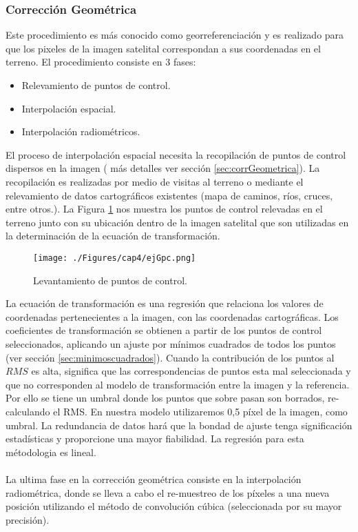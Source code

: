 \subsubsection{Correcci\'on Geom\'etrica}
Este procedimiento es m\'as conocido como georreferenciaci\'on y es realizado para que los pixeles de la imagen satelital correspondan a sus coordenadas en el terreno. El procedimiento consiste en 3 fases:
\begin{itemize}
	\item Relevamiento de puntos de control.
	\item Interpolaci\'on espacial.
	\item Interpolaci\'on radiom\'etricos.
\end{itemize}

El proceso de interpolación espacial necesita la recopilación de puntos de control dispersos en la imagen ( más detalles ver secci\'on \ref{sec:corrGeometrica}). La recopilaci\'on es realizadas por medio de visitas al terreno o mediante el relevamiento de datos cartogr\'aficos existentes (mapa de caminos, ríos, cruces, entre otros.). La Figura \ref{fig:gcp} nos muestra los puntos de control relevadas en el terreno junto con su ubicaci\'on dentro de la imagen satelital que son utilizadas en la determinaci\'on de la ecuaci\'on de transformaci\'on.
\begin{figure}[H]
	\centering
	\texttt{[image: ./Figures/cap4/ejGpc.png]}
	\caption{Levantamiento de puntos de control.}
	\label{fig:gcp}
\end{figure}

La ecuaci\'on de transformaci\'on es una regresi\'on que relaciona los valores de coordenadas pertenecientes a la imagen, con las coordenadas cartogr\'aficas. Los coeficientes de transformaci\'on se obtienen a partir de los puntos de control seleccionados, aplicando un ajuste por m\'inimos cuadrados de todos los puntos (ver secci\'on \ref{sec:minimoscuadrados}). Cuando la contribuci\'on de los puntos al $ RMS $ es alta, significa que las correspondencias de puntos esta mal seleccionada y que no corresponden al modelo de transformaci\'on entre la imagen y la referencia. Por ello se tiene un umbral donde los puntos que sobre pasan son borrados, re-calculando el RMS. En nuestra modelo utilizaremos 0,5 p\'ixel de la imagen, como umbral. La redundancia de datos har\'a que la bondad de ajuste tenga significaci\'on estad\'isticas y proporcione una mayor fiabilidad. La regresi\'on para esta m\'etodologia es lineal.\\~\\
La ultima fase en la correcci\'on geom\'etrica consiste en la interpolaci\'on radiom\'etrica, donde se lleva a cabo el re-muestreo de los p\'ixeles a una nueva posici\'on utilizando el m\'etodo de convoluci\'on c\'ubica (seleccionada por su mayor precisi\'on).\\~\\

